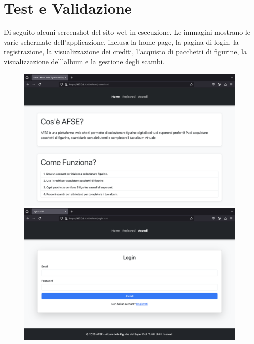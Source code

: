 \documentclass{article}
\begin{document}
\section*{Test e Validazione}
    Di seguito alcuni screenshot del sito web in esecuzione. Le immagini mostrano le varie schermate dell'applicazione, inclusa la home page, la pagina di login, la registrazione, la visualizzazione dei crediti, l'acquisto di pacchetti di figurine, la visualizzazione dell'album e la gestione degli scambi.
    \begin{figure}[H]
        \centering
        \begin{minipage}{0.3\linewidth}
            \centering
            \includegraphics[width=\linewidth]{./content/home.png}
        \end{minipage}
        \hfill
        \begin{minipage}{0.3\linewidth}
            \centering
            \includegraphics[width=\linewidth]{./content/login.png}
        \end{minipage}

\end{figure}
\end{document}
